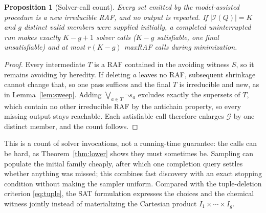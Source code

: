 \documentclass[11pt,a4paper]{article}
\theoremstyle{plain}
\newtheorem{proposition}[theorem]{Proposition}
\theoremstyle{definition}
\theoremstyle{remark}
\newcommand{\Irr}{\mathcal I}
\newcommand{\cG}{\mathcal G}
\begin{document}
\begin{proposition}[Solver-call count]\label{prop:calls}
Every set emitted by the model-assisted procedure is a new irreducible RAF, and no output is repeated. If $|\Irr(Q)|=K$ and $g$ distinct valid members were supplied initially, a completed uninterrupted run makes exactly $K-g+1$ solver calls ($K-g$ satisfiable, one final unsatisfiable) and at most $r(K-g)$ maxRAF calls during minimization.
\end{proposition}
\begin{proof}
Every intermediate $T$ is a RAF contained in the avoiding witness $S$, so it remains avoiding by heredity. If deleting $a$ leaves no RAF, subsequent shrinkage cannot change that, so one pass suffices and the final $T$ is irreducible and new, as in Lemma~\ref{lem:sweep}. Adding $\bigvee_{a\in T}\neg s_a$ excludes exactly the supersets of $T$, which contain no other irreducible RAF by the antichain property, so every missing output stays reachable. Each satisfiable call therefore enlarges $\cG$ by one distinct member, and the count follows.
\end{proof}

This is a count of solver invocations, not a running-time guarantee: the calls can be hard, as Theorem~\ref{thm:lower} shows they must sometimes be. Sampling can populate the initial family cheaply, after which one completion query settles whether anything was missed; this combines fast discovery with an exact stopping condition without making the sampler uniform. Compared with the tuple-deletion criterion \eqref{eq:tuple}, the SAT formulation expresses the choices and the chemical witness jointly instead of materializing the Cartesian product $I_1\times\cdots\times I_g$.
\end{document}
